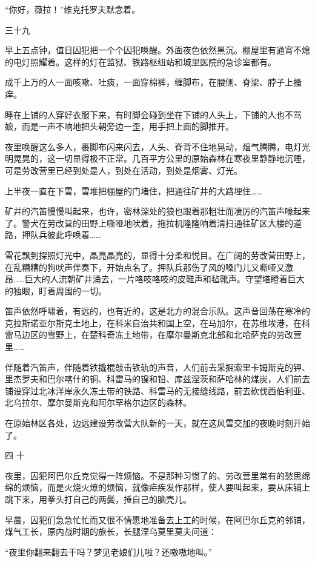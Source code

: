 “你好，薇拉！”维克托罗夫默念着。

三十九

早上五点钟，值日囚犯把一个个囚犯唤醒。外面夜色依然黑沉。棚屋里有通宵不熄的电灯照耀着。这样的灯在监狱、铁路枢纽站和城里医院的急诊室都有。

成千上万的人一面咳嗽、吐痰，一面穿棉裤，缠脚布，在腰侧、脊梁、脖子上搔痒。

睡在上铺的人穿好衣服下来，有时脚会碰到坐在下铺的人头上，下铺的人也不骂娘，而是一声不响地把头朝旁边一歪，用手把上面的脚推开。

夜里唤醒这么多人，裹脚布闪来闪去，人头、脊背不住地晃动，烟气腾腾，电灯光明晃晃的，这一切显得极不正常。几百平方公里的原始森林在寒夜里静静地沉睡，可是劳改营里已经到处是人，到处在活动，到处是烟雾、灯光。

上半夜一直在下雪，雪堆把棚屋的门堵住，把通往矿井的大路埋住……

矿井的汽笛慢慢叫起来，也许，密林深处的狼也跟着那粗壮而凄厉的汽笛声嚎起来了。警犬在劳改营的田野上嘶哑地吠着，拖拉机隆隆响着清扫通往矿区大楼的道路，押队兵彼此呼唤着……

雪花飘到探照灯光中，晶亮晶亮的，显得十分柔和悦目。在广阔的劳改营田野上，在乱糟糟的狗吠声伴奏下，开始点名了。押队兵那伤了风的嗓门儿又嘶哑又激昂……巨大的人流朝矿井涌去，一片咯吱咯吱的皮鞋声和毡靴声。守望塔瞪着巨大的独眼，盯着周围的一切。

笛声依然呼啸着，有远的，也有近的，这是北方的混合乐队。这声音回荡在寒冷的克拉斯诺亚尔斯克土地上，在科米自治共和国上空，在马加尔，在苏维埃港，在科雷马边区的雪野上，在楚科奇冻土地带，在摩尔曼斯克北部和北哈萨克的劳改营里……

伴随着汽笛声，伴随着铁撬棍敲击铁轨的声音，人们前去采掘索里卡姆斯克的钾、里杰罗夫和巴尔喀什的铜、科雷马的镍和铅、库兹涅茨和萨哈林的煤炭，人们前去铺设穿过北冰洋岸永久冻土带的铁路、科雷马的无接缝线路，前去砍伐西伯利亚、北乌拉尔、摩尔曼斯克和阿尔罕格尔边区的森林。

在原始林区各处，边远建设劳改营大队新的一天，就在这风雪交加的夜晚时刻开始了。

四 十

夜里，囚犯阿巴尔丘克觉得一阵烦恼。不是那种习惯了的、劳改营里常有的愁思绵绵的烦恼，而是火烧火燎的烦恼，就像疟疾发作那样，使人要叫起来，要从床铺上跳下来，用拳头打自己的两鬓，捶自己的脑壳儿。

早晨，囚犯们急急忙忙而又很不情愿地准备去上工的时候，在阿巴尔丘克的邻铺，煤气工长，原内战时期的旅长，长腿涅乌莫里莫夫问道：

“夜里你翻来翻去干吗？梦见老娘们儿啦？还嗷嗷地叫。”

